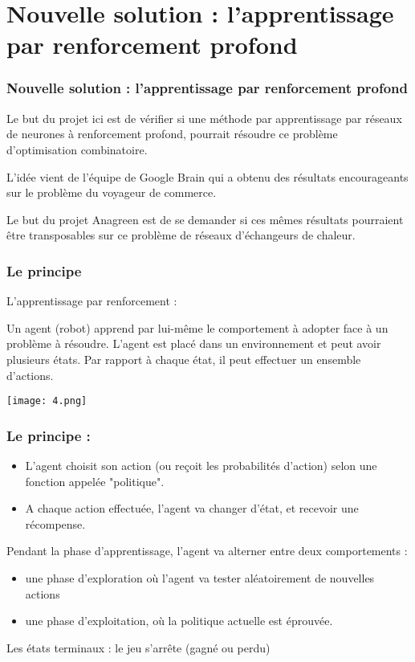 \documentclass{beamer}
\begin{document}
\section{Nouvelle solution : l'apprentissage par renforcement profond}

\begin{frame}
\frametitle{Nouvelle solution : l'apprentissage par renforcement profond}
Le but du projet ici est de vérifier si une méthode par apprentissage par
réseaux de neurones à renforcement profond, pourrait résoudre ce problème d'optimisation combinatoire.\pause \medskip

L'idée vient de l'équipe de Google Brain qui a obtenu des résultats encourageants sur le problème du voyageur de commerce.
\pause \medskip

Le but du projet Anagreen est de se demander si ces mêmes résultats pourraient être transposables sur ce problème
de réseaux d'échangeurs de chaleur.
\end{frame}

\begin{frame}

\frametitle{Le principe}
L'apprentissage par renforcement : \medskip

Un agent (robot) apprend par lui-même le comportement à adopter face à un problème à résoudre. L'agent est placé dans un environnement et peut avoir plusieurs états. Par rapport à chaque état, il peut effectuer un ensemble d'actions. \pause
\begin{center}

\texttt{[image: 4.png]}
\end{center}
\end{frame}

\begin{frame}
\frametitle{Le principe :}
\begin{itemize}
\item L'agent choisit son action (ou reçoit les probabilités d'action) selon une fonction appelée "politique".\pause
\item A chaque action effectuée, l'agent va changer d'état, et recevoir une récompense.\pause
\end{itemize}
Pendant la phase d'apprentissage,
l'agent va alterner entre deux comportements :\pause
\begin{itemize}
\item une phase d'exploration où l'agent va tester aléatoirement de nouvelles actions\pause
\item une phase d'exploitation, où la politique actuelle est éprouvée.\pause
\end{itemize}
Les états terminaux : le jeu s'arrête (gagné ou perdu)
\end{frame}
\end{document}
